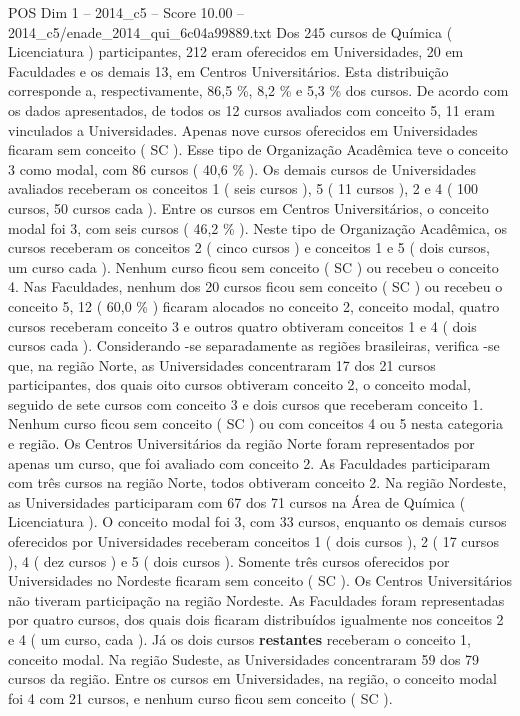 \begin{textsample}{POS Dim 1 – 2014\_c5 – Score 10.00 – 2014\_c5/enade\_2014\_qui\_6c04a99889.txt}
Dos 245 cursos de Química ( Licenciatura ) participantes, 212 eram oferecidos em Universidades, 20 em Faculdades e os demais 13, em Centros Universitários.
Esta distribuição corresponde a, respectivamente, 86,5 \%, 8,2 \% e 5,3 \% dos cursos.
De acordo com os dados apresentados, de todos os 12 cursos avaliados com conceito 5, 11 eram vinculados a Universidades.
Apenas nove cursos oferecidos em Universidades ficaram sem conceito ( SC ).
Esse tipo de Organização Acadêmica teve o conceito 3 como modal, com 86 cursos ( 40,6 \% ).
Os demais cursos de Universidades avaliados receberam os conceitos 1 ( seis cursos ), 5 ( 11 cursos ), 2 e 4 ( 100 cursos, 50 cursos cada ).
Entre os cursos em Centros Universitários, o conceito modal foi 3, com seis cursos ( 46,2 \% ).
Neste tipo de Organização Acadêmica, os cursos receberam os conceitos 2 ( cinco cursos ) e conceitos 1 e 5 ( dois cursos, um curso cada ).
Nenhum curso ficou sem conceito ( SC ) ou recebeu o conceito 4.
Nas Faculdades, nenhum dos 20 cursos ficou sem conceito ( SC ) ou recebeu o conceito 5, 12 ( 60,0 \% ) ficaram alocados no conceito 2, conceito modal, quatro cursos receberam conceito 3 e outros quatro obtiveram conceitos 1 e 4 ( dois cursos cada ).
Considerando -se separadamente as regiões brasileiras, verifica -se que, na região Norte, as Universidades concentraram 17 dos 21 cursos participantes, dos quais oito cursos obtiveram conceito 2, o conceito modal, seguido de sete cursos com conceito 3 e dois cursos que receberam conceito 1.
Nenhum curso ficou sem conceito ( SC ) ou com conceitos 4 ou 5 nesta categoria e região.
Os Centros Universitários da região Norte foram representados por apenas um curso, que foi avaliado com conceito 2.
As Faculdades participaram com três cursos na região Norte, todos obtiveram conceito 2.
Na região Nordeste, as Universidades participaram com 67 dos 71 cursos na Área de Química ( Licenciatura ).
O conceito modal foi 3, com 33 cursos, enquanto os demais cursos oferecidos por Universidades receberam conceitos 1 ( dois cursos ), 2 ( 17 cursos ), 4 ( dez cursos ) e 5 ( dois cursos ).
Somente três cursos oferecidos por Universidades no Nordeste ficaram sem conceito ( SC ).
Os Centros Universitários não tiveram participação na região Nordeste.
As Faculdades foram representadas por quatro cursos, dos quais dois ficaram distribuídos igualmente nos conceitos 2 e 4 ( um curso, cada ).
Já os dois cursos \textbf{restantes} receberam o conceito 1, conceito modal.
Na região Sudeste, as Universidades concentraram 59 dos 79 cursos da região.
Entre os cursos em Universidades, na região, o conceito modal foi 4 com 21 cursos, e nenhum curso ficou sem conceito ( SC ).

\end{textsample}
